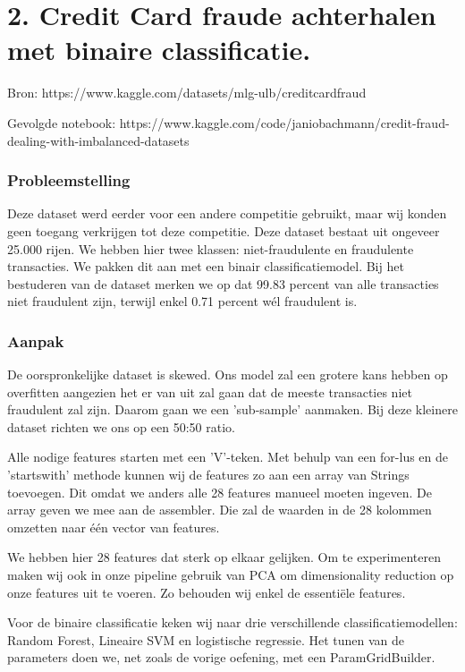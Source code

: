 \documentclass[a4paper,10pt,twoside]{report}
\begin{document}
\chapter*{2. Credit Card fraude achterhalen met binaire classificatie. }

Bron: https://www.kaggle.com/datasets/mlg-ulb/creditcardfraud

Gevolgde notebook: https://www.kaggle.com/code/janiobachmann/credit-fraud-dealing-with-imbalanced-datasets

\subsection*{Probleemstelling}

Deze dataset werd eerder voor een andere competitie gebruikt, maar wij konden geen toegang verkrijgen tot deze competitie. Deze dataset bestaat uit ongeveer 25.000 rijen. We hebben hier twee klassen: niet-fraudulente en fraudulente transacties. We pakken dit aan met een binair classificatiemodel. Bij het bestuderen van de dataset merken we op dat 99.83 percent van alle transacties niet fraudulent zijn, terwijl enkel 0.71 percent wél fraudulent is.

\subsection*{Aanpak}

De oorspronkelijke dataset is skewed. Ons model zal een grotere kans hebben op overfitten aangezien het er van uit zal gaan dat de meeste transacties niet fraudulent zal zijn. Daarom gaan we een 'sub-sample' aanmaken. Bij deze kleinere dataset richten we ons op een 50:50 ratio.

Alle nodige features starten met een 'V'-teken. Met behulp van een for-lus en de 'startswith' methode kunnen wij de features zo aan een array van Strings toevoegen. Dit omdat we anders alle 28 features manueel moeten ingeven. De array geven we mee aan de assembler. Die zal de waarden in de 28 kolommen omzetten naar één vector van features.

We hebben hier 28 features dat sterk op elkaar gelijken. Om te experimenteren maken wij ook in onze pipeline gebruik van PCA om dimensionality reduction op onze features uit te voeren. Zo behouden wij enkel de essentiële features.

Voor de binaire classificatie keken wij naar drie verschillende classificatiemodellen: Random Forest, Lineaire SVM en logistische regressie. Het tunen van de parameters doen we, net zoals de vorige oefening, met een ParamGridBuilder.
\end{document}
